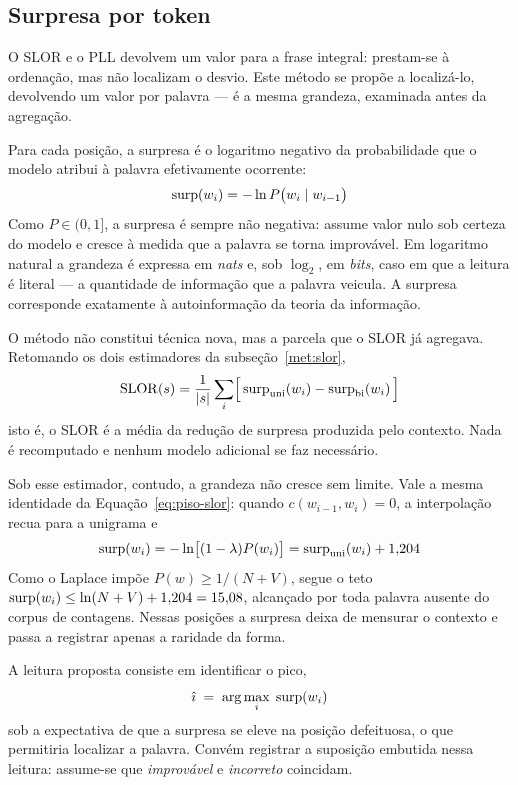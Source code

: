 \subsection{Surpresa por token}
\label{met:surpresa}

\indent\indent O SLOR e o PLL devolvem um valor para a frase integral: prestam-se à ordenação, mas não
localizam o desvio. Este método se propõe a localizá-lo, devolvendo um valor por palavra --- é
a mesma grandeza, examinada antes da agregação.

Para cada posição, a surpresa é o logaritmo negativo da probabilidade que o modelo atribui à
palavra efetivamente ocorrente:
%
\begin{equation}
\mathrm{surp}(w_i) = -\ln P\bigl(w_i \mid w_{i-1}\bigr)
\label{eq:surp}
\end{equation}
%
Como $P \in (0,1]$, a surpresa é sempre não negativa: assume valor nulo sob certeza do modelo e
cresce à medida que a palavra se torna improvável. Em logaritmo natural a grandeza é expressa
em \emph{nats} e, sob $\log_2$, em \emph{bits}, caso em que a leitura é literal --- a
quantidade de informação que a palavra veicula. A surpresa corresponde exatamente à
autoinformação da teoria da informação.

O método não constitui técnica nova, mas a parcela que o SLOR já agregava. Retomando os dois
estimadores da subseção~\ref{met:slor},
%
\begin{equation}
\mathrm{SLOR}(s) = \frac{1}{|s|}\sum_{i} \Bigl[\,\mathrm{surp}_{\mathrm{uni}}(w_i)
- \mathrm{surp}_{\mathrm{bi}}(w_i)\,\Bigr]
\label{eq:surp-slor}
\end{equation}
%
isto é, o SLOR é a média da redução de surpresa produzida pelo contexto. Nada é recomputado e
nenhum modelo adicional se faz necessário.

Sob esse estimador, contudo, a grandeza não cresce sem limite. Vale a mesma identidade da
Equação~\ref{eq:piso-slor}: quando $c(w_{i-1},w_i) = 0$, a interpolação recua para a unigrama e
%
\begin{equation}
\mathrm{surp}(w_i) = -\ln\bigl[(1-\lambda)P(w_i)\bigr] = \mathrm{surp}_{\mathrm{uni}}(w_i) + 1{,}204
\label{eq:teto-surpresa}
\end{equation}
%
Como o Laplace impõe $P(w) \geq 1/(N+V)$, segue o teto
$\mathrm{surp}(w_i) \leq \ln(N+V) + 1{,}204 = 15{,}08$, alcançado por toda palavra ausente do corpus de
contagens. Nessas posições a surpresa deixa de mensurar o contexto e passa a registrar apenas
a raridade da forma.

A leitura proposta consiste em identificar o pico,
%
\begin{equation}
\hat{\imath} \;=\; \arg\max_{i} \; \mathrm{surp}(w_i)
\label{eq:surp-argmax}
\end{equation}
%
sob a expectativa de que a surpresa se eleve na posição defeituosa, o que permitiria localizar
a palavra. Convém registrar a suposição embutida nessa leitura: assume-se que \emph{improvável}
e \emph{incorreto} coincidam.
